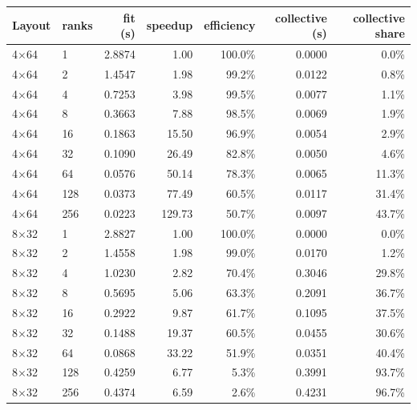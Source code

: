 \begin{tabular}{llrrrrr}
\toprule
Layout & ranks & fit (s) & speedup & efficiency & collective (s) & collective share\\
\midrule
4$\times$64 & 1 & 2.8874 & 1.00 & 100.0\% & 0.0000 & 0.0\%\\
4$\times$64 & 2 & 1.4547 & 1.98 & 99.2\% & 0.0122 & 0.8\%\\
4$\times$64 & 4 & 0.7253 & 3.98 & 99.5\% & 0.0077 & 1.1\%\\
4$\times$64 & 8 & 0.3663 & 7.88 & 98.5\% & 0.0069 & 1.9\%\\
4$\times$64 & 16 & 0.1863 & 15.50 & 96.9\% & 0.0054 & 2.9\%\\
4$\times$64 & 32 & 0.1090 & 26.49 & 82.8\% & 0.0050 & 4.6\%\\
4$\times$64 & 64 & 0.0576 & 50.14 & 78.3\% & 0.0065 & 11.3\%\\
4$\times$64 & 128 & 0.0373 & 77.49 & 60.5\% & 0.0117 & 31.4\%\\
4$\times$64 & 256 & 0.0223 & 129.73 & 50.7\% & 0.0097 & 43.7\%\\
8$\times$32 & 1 & 2.8827 & 1.00 & 100.0\% & 0.0000 & 0.0\%\\
8$\times$32 & 2 & 1.4558 & 1.98 & 99.0\% & 0.0170 & 1.2\%\\
8$\times$32 & 4 & 1.0230 & 2.82 & 70.4\% & 0.3046 & 29.8\%\\
8$\times$32 & 8 & 0.5695 & 5.06 & 63.3\% & 0.2091 & 36.7\%\\
8$\times$32 & 16 & 0.2922 & 9.87 & 61.7\% & 0.1095 & 37.5\%\\
8$\times$32 & 32 & 0.1488 & 19.37 & 60.5\% & 0.0455 & 30.6\%\\
8$\times$32 & 64 & 0.0868 & 33.22 & 51.9\% & 0.0351 & 40.4\%\\
8$\times$32 & 128 & 0.4259 & 6.77 & 5.3\% & 0.3991 & 93.7\%\\
8$\times$32 & 256 & 0.4374 & 6.59 & 2.6\% & 0.4231 & 96.7\%\\
\bottomrule
\end{tabular}
